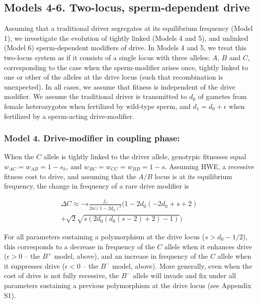 \documentclass{pnastwo}
\begin{document}
\begin{article}
 
 
\subsection{Models 4-6. Two-locus, sperm-dependent drive} 
Assuming that a traditional driver segregates at its equilibrium frequency (Model 1), we investigate the evolution of tightly linked (Models 4 and 5), and unlinked (Model 6) sperm-dependent modifiers of drive. 
In Models 4 and 5, we treat this two-locus system as if it consists of
a single locus with three alleles: $A$, $B$ and $C$, corresponding to the case when the
sperm-modifier arises once, tightly linked to one or other of the
alleles at the drive locus (such that recombination is unexpected). 
In all cases, we assume that fitness is independent of the drive modifier.  
We assume the traditional driver is transmitted to $d_0$ of gametes from female heterozygotes  when fertilized by wild-type sperm, and $d_1=d_0+\epsilon$ when fertilized by a sperm-acting drive-modifier.

\subsubsection*{Model 4. Drive-modifier in coupling phase:}
When the $C$ allele is tightly linked to the driver allele, 
	genotypic fitnesses equal $w_{AC}=w_{AB}=1-s_h$, and $w_{BC}=w_{CC}=w_{BB}=1-s$. 
Assuming HWE, a recessive fitness cost to drive, and assuming that the $A/B$ locus is at its equilibrium frequency, the change in frequency of a rare drive modifier is


\begin{eqnarray}\nonumber
\Delta C\approx -\epsilon \frac{f_C}{2 \bar{w}(1-2 d_0)^2} \bigg( 1-2 d_0 (-2 d_0+s+2) \\
 +\sqrt{2} \sqrt{s (2 d_0 (d_0(s-2)+2)-1)} \bigg)
	\label{coupling}
\end{eqnarray} 



For all parameters sustaining a polymorphism at the drive locus ($s>d_0-1/2$), this corresponds to a decrease in frequency of the $C$ allele when it enhances drive ($\epsilon >0$ -- the $B^+$ model, above), 
	and an increase in frequency of the $C$ allele when it suppresses drive ($\epsilon <0$ -- the $B^-$ model, above). 
More generally, even when the cost of drive is not fully recessive, the $B^-$ allele will invade and fix under all parameters sustaining a previous polymorphism at the drive locus (see Appendix S1). 
 

\end{article}
\end{document}
